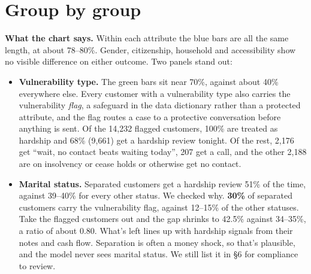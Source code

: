 \documentclass[11pt]{article}
\begin{document}

\section{Group by group}


\textbf{What the chart says.} Within each attribute the blue bars are all the same length, at about 78–80\%. Gender, citizenship,
household and accessibility show no visible difference on either outcome. Two panels stand out:

\begin{itemize}
\item \textbf{Vulnerability type.} The green bars sit near 70\%, against about 40\% everywhere else. Every customer with a vulnerability
type also carries the vulnerability \emph{flag}, a safeguard in the data dictionary rather than a protected attribute, and the
flag routes a case to a protective conversation before anything is sent. Of the 14,232 flagged customers, 100\% are treated as
hardship and 68\% (9,661) get a hardship review tonight. Of the rest, 2,176 get ``wait, no contact beats waiting today'', 207 get a call,
and the other 2,188 are on insolvency or cease holds or otherwise get no contact.
\item \textbf{Marital status.} Separated customers get a hardship review 51\% of the time, against 39–40\% for every other status.
We checked why. \textbf{30\%} of separated customers carry the vulnerability flag, against 12–15\% of the other statuses. Take
the flagged customers out and the gap shrinks to 42.5\% against 34–35\%, a ratio of about 0.80. What's left lines up with
hardship signals from their notes and cash flow. Separation is often a money shock, so that's plausible, and the model never sees
marital status. We still list it in §6 for compliance to review.
\end{itemize}
\end{document}
